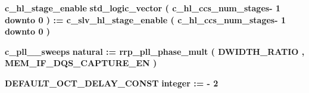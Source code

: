 \begin{DoxyCompactItemize}
\item 
{\bf c\+\_\+hl\+\_\+stage\+\_\+enable} {\bfseries \textcolor{comment}{std\+\_\+logic\+\_\+vector}\textcolor{vhdlchar}{ }\textcolor{vhdlchar}{(}\textcolor{vhdlchar}{ }\textcolor{vhdlchar}{ }\textcolor{vhdlchar}{ }\textcolor{vhdlchar}{ }\textcolor{vhdlchar}{c\+\_\+hl\+\_\+ccs\+\_\+num\+\_\+stages}\textcolor{vhdlchar}{-\/}\textcolor{vhdlchar}{ } \textcolor{vhdldigit}{1} \textcolor{vhdlchar}{ }\textcolor{keywordflow}{downto}\textcolor{vhdlchar}{ }\textcolor{vhdlchar}{ } \textcolor{vhdldigit}{0} \textcolor{vhdlchar}{ }\textcolor{vhdlchar}{)}\textcolor{vhdlchar}{ }\textcolor{vhdlchar}{ }\textcolor{vhdlchar}{ }\textcolor{vhdlchar}{\+:}\textcolor{vhdlchar}{=}\textcolor{vhdlchar}{ }\textcolor{vhdlchar}{ }\textcolor{vhdlchar}{ }\textcolor{vhdlchar}{ }{\bfseries {\bf c\+\_\+slv\+\_\+hl\+\_\+stage\+\_\+enable}} \textcolor{vhdlchar}{ }\textcolor{vhdlchar}{(}\textcolor{vhdlchar}{ }\textcolor{vhdlchar}{ }\textcolor{vhdlchar}{ }\textcolor{vhdlchar}{ }\textcolor{vhdlchar}{c\+\_\+hl\+\_\+ccs\+\_\+num\+\_\+stages}\textcolor{vhdlchar}{-\/}\textcolor{vhdlchar}{ } \textcolor{vhdldigit}{1} \textcolor{vhdlchar}{ }\textcolor{keywordflow}{downto}\textcolor{vhdlchar}{ }\textcolor{vhdlchar}{ } \textcolor{vhdldigit}{0} \textcolor{vhdlchar}{ }\textcolor{vhdlchar}{)}\textcolor{vhdlchar}{ }} 
\item 
{\bf c\+\_\+pll\+\_\+\_\+sweeps} {\bfseries \textcolor{comment}{natural}\textcolor{vhdlchar}{ }\textcolor{vhdlchar}{ }\textcolor{vhdlchar}{\+:}\textcolor{vhdlchar}{=}\textcolor{vhdlchar}{ }\textcolor{vhdlchar}{ }\textcolor{vhdlchar}{ }\textcolor{vhdlchar}{ }\textcolor{vhdlchar}{rrp\+\_\+pll\+\_\+phase\+\_\+mult}\textcolor{vhdlchar}{ }\textcolor{vhdlchar}{(}\textcolor{vhdlchar}{ }\textcolor{vhdlchar}{ }\textcolor{vhdlchar}{ }\textcolor{vhdlchar}{ }{\bfseries {\bf D\+W\+I\+D\+T\+H\+\_\+\+R\+A\+T\+IO}} \textcolor{vhdlchar}{ }\textcolor{vhdlchar}{,}\textcolor{vhdlchar}{ }\textcolor{vhdlchar}{ }\textcolor{vhdlchar}{ }\textcolor{vhdlchar}{ }{\bfseries {\bf M\+E\+M\+\_\+\+I\+F\+\_\+\+D\+Q\+S\+\_\+\+C\+A\+P\+T\+U\+R\+E\+\_\+\+EN}} \textcolor{vhdlchar}{ }\textcolor{vhdlchar}{)}\textcolor{vhdlchar}{ }} 
\item 
{\bf D\+E\+F\+A\+U\+L\+T\+\_\+\+O\+C\+T\+\_\+\+D\+E\+L\+A\+Y\+\_\+\+C\+O\+N\+ST} {\bfseries \textcolor{comment}{integer}\textcolor{vhdlchar}{ }\textcolor{vhdlchar}{ }\textcolor{vhdlchar}{\+:}\textcolor{vhdlchar}{=}\textcolor{vhdlchar}{ }\textcolor{vhdlchar}{-\/}\textcolor{vhdlchar}{ } \textcolor{vhdldigit}{2} \textcolor{vhdlchar}{ }} 
\item 

\end{DoxyCompactItemize}
